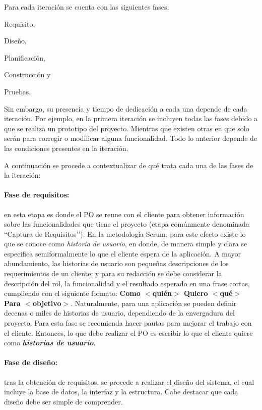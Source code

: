 Para cada iteración se cuenta con las siguientes fases:
\begin{enumerate*}[label=(\roman*)]
    \item Requisito,
    \item Diseño,
    \item Planificación,
    \item Construcción y
    \item Pruebas.
\end{enumerate*}
Sin embargo, su presencia y tiempo de dedicación a cada una depende de cada iteración. Por ejemplo, en la primera iteración se incluyen todas las fases debido a que se realiza un prototipo del proyecto. Mientras que existen otras en que solo serán para corregir o modificar alguna funcionalidad. Todo lo anterior depende de las condiciones presentes en la iteración.

A continuación se procede a contextualizar de qué trata cada una de las fases de la iteración:

\paragraph{Fase de requisitos: } en esta etapa es donde el PO se reune con el cliente para obtener información sobre las funcionalidades que tiene el proyecto (etapa comúnmente denominada ``Captura de Requisitos’’). En la metodología Scrum, para este efecto existe lo que se conoce como \emph{historia de usuario}, en donde, de manera simple y clara se especifica semiformalmente lo que el cliente espera de la aplicación. A mayor abundamiento, las historias de usuario son pequeñas descripciones de los requerimientos de un cliente; y para su redacción se debe considerar la descripción del rol, la funcionalidad y el resultado esperado en una frase cortas, cumpliendo con el siguiente formato: \textbf{Como $<$quién$>$ Quiero $<$qué$>$ Para $<$objetivo$>$}. Naturalmente, para una aplicación se pueden definir decenas o miles de historias de usuario, dependiendo de la envergadura del proyecto. Para esta fase se recomienda hacer pautas para mejorar el trabajo con el cliente. Entonces, lo que debe realizar el PO es escribir lo que el cliente quiere como \textbf{\emph{historias de usuario}}.


\paragraph{Fase de diseño: } tras la obtención de requisitos, se procede a realizar el diseño del sistema, el cual incluye la base de datos, la interfaz y la estructura. Cabe destacar que cada diseño debe ser simple de comprender.

